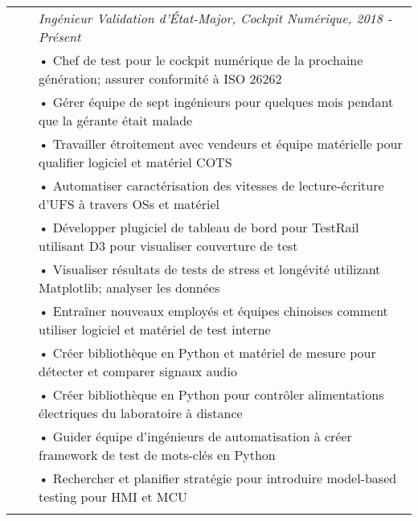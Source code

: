 \documentclass{minimal}
\begin{document}
\begin{tabular}{ p{1.5cm} p{1cm} p{16cm} }
& & \textit{Ingénieur Validation d'État-Major, Cockpit Numérique, 2018 - Présent}\\
& & • Chef de test pour le cockpit numérique de la prochaine génération; assurer conformité à ISO 26262\\
& & • Gérer équipe de sept ingénieurs pour quelques mois pendant que la gérante était malade\\
& & • Travailler étroitement avec vendeurs et équipe matérielle pour qualifier logiciel et matériel COTS\\
& & • Automatiser caractérisation des vitesses de lecture-écriture d'UFS à travers OSs et matériel\\
& & • Développer plugiciel de tableau de bord pour TestRail utilisant D3 pour visualiser couverture de test\\
& & • Visualiser résultats de tests de stress et longévité utilizant Matplotlib; analyser les données\\
& & • Entraîner nouveaux employés et équipes chinoises comment utiliser logiciel et matériel de test interne\\
& & • Créer bibliothèque en Python et matériel de mesure pour détecter et comparer signaux audio\\
& & • Créer bibliothèque en Python pour contrôler alimentations électriques du laboratoire à distance\\ 
& & • Guider équipe d'ingénieurs de automatisation à créer framework de test de mots-clés en Python\\
& & • Rechercher et planifier stratégie pour introduire model-based testing pour HMI et MCU\\
& & \\
\end{tabular}
\end{document}

